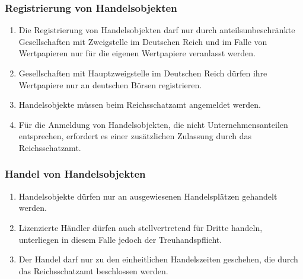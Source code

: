 \documentclass{article}
\begin{document}
\subsubsection{Registrierung von Handelsobjekten}
\begin{enumerate}[(1)]
    \item Die Registrierung von Handelsobjekten darf nur durch anteilsunbeschränkte Gesellschaften mit Zweigstelle im Deutschen Reich und im Falle von Wertpapieren nur für die eigenen Wertpapiere veranlasst werden.
    \item Gesellschaften mit Hauptzweigstelle im Deutschen Reich dürfen ihre Wertpapiere nur an deutschen Börsen registrieren.
    \item Handelsobjekte müssen beim Reichsschatzamt angemeldet werden.
    \item Für die Anmeldung von Handelsobjekten, die nicht Unternehmensanteilen entsprechen, erfordert es einer zusätzlichen Zulassung durch das Reichsschatzamt.
\end{enumerate}

\subsubsection{Handel von Handelsobjekten}
\begin{enumerate}[(1)]
    \item Handelsobjekte dürfen nur an ausgewiesenen Handelsplätzen gehandelt werden.
    \item Lizenzierte Händler dürfen auch stellvertretend für Dritte handeln, unterliegen in diesem Falle jedoch der Treuhandspflicht.
    \item Der Handel darf nur zu den einheitlichen Handelszeiten geschehen, die durch das Reichsschatzamt beschlossen werden.
\end{enumerate}
\end{document}
